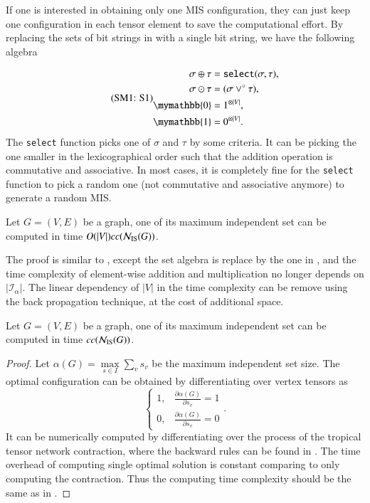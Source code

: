 \documentclass[review, onefignum, onetabnum]{siamart190516}
\begin{document}
If one is interested in obtaining only one MIS configuration, they can just keep one configuration in each tensor element to save the computational effort.
By replacing the sets of bit strings in  with a single bit string, we have the following algebra

\begin{equation}
\eqname{S1}
\begin{split}
    \sigma \oplus \tau &= \texttt{select}(\sigma, \tau), \\
    \sigma \odot \tau &= (\sigma\lor^\circ \tau),\\
    \mymathbb{0} &= 1^{\otimes |V|}, \\
    \mymathbb{1} &= 0^{\otimes |V|}.
\end{split}\label{eq:singleconfig}
\end{equation}
The \texttt{select} function picks one of $\sigma$ and $\tau$ by some criteria.
It can be picking the one smaller in the lexicographical order such that the addition operation is commutative and associative.
In most cases, it is completely fine for the \texttt{select} function to pick a random one (not commutative and associative anymore) to generate a random MIS.

\begin{proposition}
    Let $G = (V, E)$ be a graph, one of its maximum independent set can be computed in time $O(|V|)cc({\mathcal{N}_{\rm IS}(G)})$.
\end{proposition}
The proof is similar to , except the set algebra is replace by the one in , and the time complexity of element-wise addition and multiplication no longer depends on $|\mathcal{I}_\alpha|$.
The linear dependency of $|V|$ in the time complexity can be remove using the back propagation technique, at the cost of additional space.
\begin{theorem}
    Let $G = (V, E)$ be a graph, one of its maximum independent set can be computed in time $cc({\mathcal{N}_{\rm IS}(G)})$.
\end{theorem}
\begin{proof}
    Let $\alpha(G) = \max\limits_{s \in I} \sum_{v} s_v$ be the maximum independent set size. The optimal configuration can be obtained by differentiating over vertex tensors as
    \begin{equation}
    \begin{cases}
        1, &\frac{\partial \alpha(G)}{\partial s_v} = 1\\
        0, &\frac{\partial \alpha(G)}{\partial s_v} = 0
    \end{cases}.
    \end{equation}
    It can be numerically computed by differentiating over the process of the tropical tensor network contraction, where the backward rules can be found in . The time overhead of computing single optimal solution is constant comparing to only computing the contraction. Thus the computing time complexity should be the same as in .
\end{proof}
\end{document}
